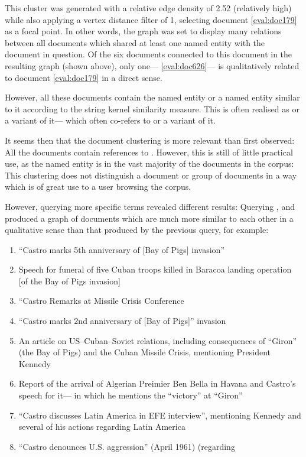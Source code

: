 This cluster was generated with a relative edge density of 2.52 (relatively high) while also applying a vertex distance filter of 1, selecting document \ref{eval:doc179} as a focal point. In other words, the graph was set to display many relations between all documents which shared at least one named entity with the document in question. Of the six documents connected to this document in the resulting graph (shown above), only one--- \ref{eval:doc626}--- is qualitatively related to document \ref{eval:doc179} in a direct sense.

However, all these documents contain the named entity  or a named entity similar to it according to the string kernel similarity measure. This is often realised as  or a variant of it--- which often co-refers to  or a variant of it.

It seems then that the document clustering is more relevant than first observed: All the documents contain references to . However, this is still of little practical use, as the named entity  is in the vast majority of the documents in the corpus: This clustering does not distinguish a document or group of documents in a way which is of great use to a user browsing the corpus.

However, querying more specific terms revealed different results: Querying , and  produced a graph of documents which are much more similar to each other in a qualitative sense than that produced by the previous query, for example:

\begin{enumerate}
\item ``Castro marks 5th anniversary of [Bay of Pigs] invasion'' \label{eval:doc274}
\item Speech for funeral of five Cuban troops killed in Baracoa landing operation [of the Bay of Pigs invasion]\label{eval:doc337}
\item ``Castro Remarks at Missile Crisis Conference\label{eval:doc1418}
\item ``Castro marks 2nd anniversary of [Bay of Pigs]'' invasion \label{eval:doc210}
\item An article on US--Cuban--Soviet relations, including consequences of ``Giron'' (the Bay of Pigs) and the Cuban Missile Crisis, mentioning President Kennedy\label{eval:doc864}
\item Report of the arrival of Algerian Preimier Ben Bella in Havana and Castro's speech for it--- in which he mentions the ``victory'' at ``Giron''
\item ``Castro discusses Latin America in EFE interview'', mentioning Kennedy and several of his actions regarding Latin America \label{eval:doc923}
\item ``Castro denounces U.S. aggression'' (April 1961) \label{eval:doc134} (regarding 
\end{enumerate} 

